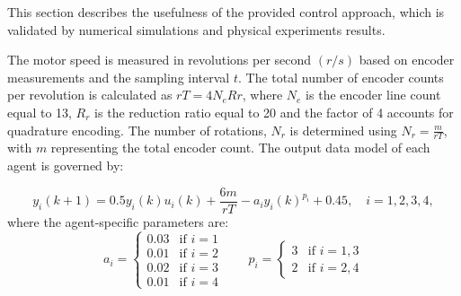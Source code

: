 \documentclass[journal,onecolumn]{IEEEtran}
\begin{document}

This section describes the usefulness of the provided control approach, which is validated by numerical simulations and physical experiments results. 

The motor speed is measured in revolutions per second $(r/s)$ based on encoder measurements and the sampling interval $t$. The total number of encoder counts per revolution is calculated as $ rT=4N_{e}R{r} $, where $N_e$ is the encoder line count equal to 13, $R_r$ is the reduction ratio equal to 20 and the factor of 4 accounts for quadrature encoding. The number of rotations, $N_r$ is determined using $N_r = \frac{m}{rT}$, with $m$ representing the total encoder count. The output data model of each agent is governed by:






\[
y_i(k+1) = 0.5 y_i(k) u_i(k) + \frac{6m}{rT} - a_i y_i(k)^{p_i} + 0.45, \quad i = 1, 2, 3, 4,
\]
where the agent-specific parameters are:
\[
a_i = \begin{cases} 
0.03 & \text{if } i=1 \\
0.01 & \text{if } i=2 \\
0.02 & \text{if } i=3 \\
0.01 & \text{if } i=4
\end{cases}
\qquad
p_i = \begin{cases} 
3 & \text{if } i=1, 3 \\
2 & \text{if } i=2, 4
\end{cases}
\]
\end{document}
